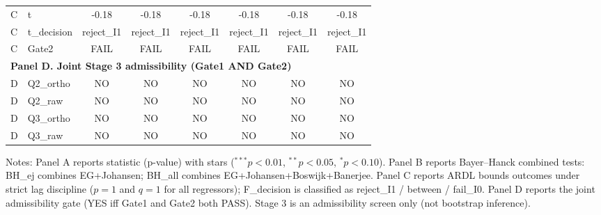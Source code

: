 \begin{table}[!ht]
\begin{tabular}{ll|cc|cc|cc}
C & t & -0.18 & -0.18 & -0.18 & -0.18 & -0.18 & -0.18
\\
C & t\_decision & reject\_I1 & reject\_I1 & reject\_I1 & reject\_I1 & reject\_I1 & reject\_I1
\\
C & Gate2 & FAIL & FAIL & FAIL & FAIL & FAIL & FAIL
\\
\hline
\multicolumn{8}{l}{\textbf{Panel D. Joint Stage 3 admissibility (Gate1 AND Gate2)}}\\
\hline
D & Q2\_ortho & NO & NO & NO & NO & NO & NO
\\
D & Q2\_raw & NO & NO & NO & NO & NO & NO
\\
D & Q3\_ortho & NO & NO & NO & NO & NO & NO
\\
D & Q3\_raw & NO & NO & NO & NO & NO & NO
\\
\hline
\end{tabular}
\vspace{0.4em}
\footnotesize{Notes: Panel A reports statistic (p-value) with stars ($^{***}p<0.01$, $^{**}p<0.05$, $^{*}p<0.10$). Panel B reports Bayer--Hanck combined tests: BH\_ej combines EG+Johansen; BH\_all combines EG+Johansen+Boswijk+Banerjee. Panel C reports ARDL bounds outcomes under strict lag discipline ($p=1$ and $q=1$ for all regressors); F\_decision is classified as reject\_I1 / between / fail\_I0. Panel D reports the joint admissibility gate (YES iff Gate1 and Gate2 both PASS). Stage 3 is an admissibility screen only (not bootstrap inference).}
\end{table}
